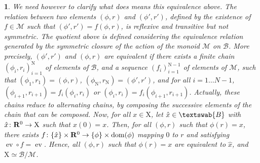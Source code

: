 \documentclass[12pt,reqno]{amsart}
\theoremstyle{article}
\newtheorem{article}{}
\def \N{\mathrm N}
\def \X{\mathrm X}
\newcommand{\RR}{{\bf R}}
\newcommand{\cB}{{\mathcal B}}
\newcommand{\cM}{\mathcal{M}}
\newcommand{\fB}{\textswab{B}}
\DeclareMathOperator{\dom}{dom}
\DeclareMathOperator{\ev}{ev}
\begin{document}
\begin{article}
    We need however to clarify what does means this equivalence above.
    The relation between two elements $(\phi,r)$ and $(\phi',r')$,
    defined by the existence of $f \in \cM$ such that $(\phi',r') = f(\phi,r)$,
    is reflexive and transitive but not symmetric.
    The quotient above is defined considering the equivalence relation generated by the symmetric closure of the action of the monoid $\cM$ on $\cB$.
    More precisely,
    $(\phi',r')$ and $(\phi,r)$ are equivalent if there exists a finite chain $(\phi_i,r_i)_{i=1}^\N$ of elements of $\cB$,
    and a sequence $(f_i)_{i=1}^{\N-1}$ of elements of $\cM$,
    such that $(\phi_1,r_1) = (\phi,r)$,
    $(\phi_\N,r_\N) = (\phi',r')$,
    and for all $i = 1\ldots N-1$,
    $(\phi_{i+1},r_{i+1}) = f_i(\phi_i,r_i)$ or $(\phi_i,r_i) = f_i(\phi_{i+1},r_{i+1})$.
    Actually,
    these chains reduce to alternating chains,
    by composing the successive elements of the chain that can be composed.
    Now,
    for all $x \in \X$,
    let $\hat x \in \fB$ with $\hat x \colon \RR^0 \to \X$ such that $\hat x(0) = x$.
    Then,
    for all $(\phi,r)$ such that $\phi(r)=x$,
    there exists $f \colon \{\hat x\} \times \RR^0 \to \{\phi\} \times \dom(\phi)$ mapping $0$ to $r$ and satisfying $\ev \circ f = \ev$.
    Hence,
    all $(\phi,r)$ such that $\phi(r) = x$ are equivalent to $\hat x$,
    and $\X \simeq \cB/\cM$.
  \end{article}
  
\end{document}

